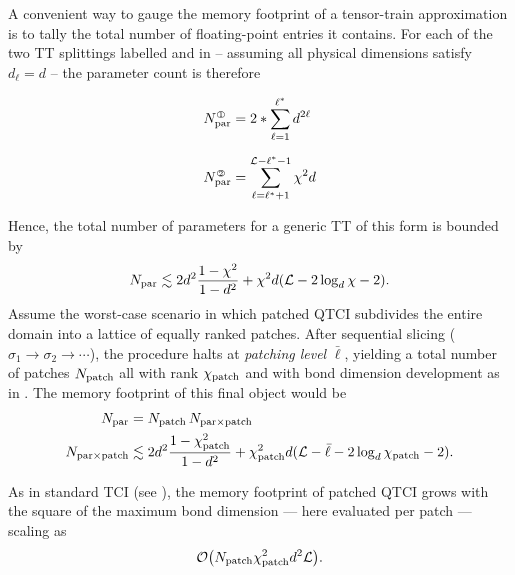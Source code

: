 A convenient way to gauge the memory footprint of a tensor-train approximation is to tally the total number of floating-point entries it contains. For each of the two TT splittings labelled  and  in  -- assuming all physical dimensions satisfy $d_\ell = d$ -- the parameter count is therefore

\begin{equation}
	\begin{aligned}
		N^{\raisebox{.5pt}{\tiny \textcircled{\raisebox{-0.6pt} {1}}}}_{\text{par}} &= 2 *\sum\limits_{\ell = 1}^{\ell^*} d^{2\ell}  \\[6pt]
		N^{\raisebox{.5pt}{\tiny \textcircled{\raisebox{-0.6pt} {2}}}}_{\text{par}} &= \sum\limits_{\ell = \ell^* + 1}^{\mL - \ell^* - 1} \chi^2d
	\end{aligned}
\end{equation}

Hence, the total number of parameters for a generic TT of this form is bounded by
\begin{equation} 
	N_{\text{par}} \lesssim 2 d^2 \frac{1 - \chi^2 }{1 - d^2} + \chi^2d (\mathcal{L} - 2 \log_d \chi - 2). 
\end{equation}
Assume the worst-case scenario in which patched QTCI subdivides the entire domain into a lattice of equally ranked patches. After sequential slicing ($\sigma_1 \to \sigma_2 \to \cdots$), the procedure halts at \textit{patching level} ${\bar \ell}$, yielding a total number of patches $N_{\text{patch}}$ all with rank $\chi_{\text{patch}}$ and with bond dimension development as in . The memory footprint of this final object would be 
\begin{equation}
	\begin{aligned}
		N_{\text{par}} &= N_{\text{patch}}\, N_{\text{par}\times \text{patch}}\\
		N_{\text{par}\times \text{patch}} &\lesssim  2 d^2 \frac{1 - \chi_{\text{patch}}^2 }{1 - d^2} + \chi_{\text{patch}}^2d (\mathcal{L} - {\bar \ell} - 2 \log_d \chi_{\text{patch}} - 2).
	\end{aligned}
	\label{eq:patchMemoryEstimate}
\end{equation}

As in standard TCI (see ), the memory footprint of patched QTCI grows with the square of the maximum bond dimension — here evaluated per patch — scaling as  
\begin{equation}
	\mathcal{O}\bigl(N_{\text{patch}} \chi_{\text{patch}}^2 d^2 \mathcal{L}\bigr). 
	\label{eq:PatchMemoryScaling}
\end{equation}

